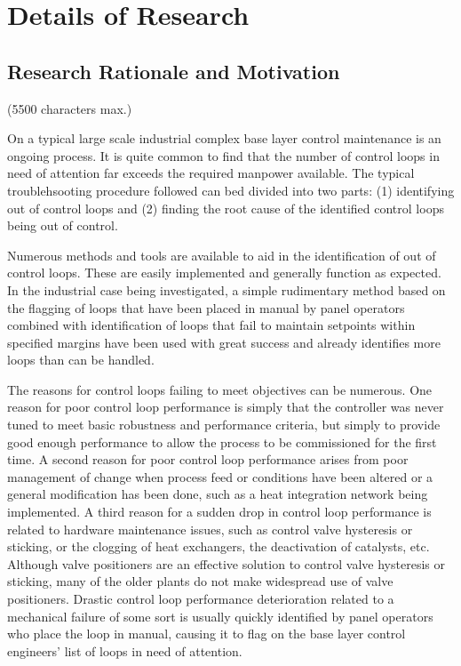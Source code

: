 \documentclass[a4paper]{book}
\begin{document}
\section{Details of Research}

\subsection{Research Rationale and Motivation}
(5500 characters max.)


On a typical large scale industrial complex base layer control maintenance is an ongoing process.
It is quite common to find that the number of control loops in need of attention far exceeds the required manpower available.
The typical troublehsooting procedure followed can bed divided into two parts:
(1) identifying out of control loops and
(2) finding the root cause of the identified control loops being out of control.

Numerous methods and tools are available to aid in the identification of out of control loops.
These are easily implemented and generally function as expected.
In the industrial case being investigated, a simple rudimentary method based on the flagging of loops that have been placed in manual by panel operators combined with identification of loops that fail to maintain setpoints within specified margins have been used with great success and already identifies more loops than can be handled.

The reasons for control loops failing to meet objectives can be numerous.
One reason for poor control loop performance is simply that the controller was never tuned to meet basic robustness and performance criteria, but simply to provide good enough performance to allow the process to be commissioned for the first time.
A second reason for poor control loop performance arises from poor management of change when process feed or conditions have been altered or a general modification has been done, such as a heat integration network being implemented.
A third reason for a sudden drop in control loop performance is related to hardware maintenance issues, such as control valve hysteresis or sticking, or the clogging of heat exchangers, the deactivation of catalysts, etc.
Although valve positioners are an effective solution to control valve hysteresis or sticking, many of the older plants do not make widespread use of valve positioners.
Drastic control loop performance deterioration related to a mechanical failure of some sort is usually quickly identified by panel operators who place the loop in manual, causing it to flag on the base layer control engineers' list of loops in need of attention.
\end{document}
